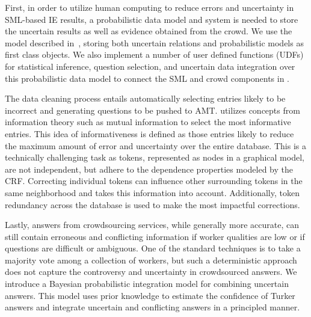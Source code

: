 First, in order to utilize human computing to reduce errors and uncertainty in SML-based IE results, a probabilistic data model and system is needed to store the uncertain results as well as evidence obtained from the crowd.  We use the model described in~\cite{DBLP:conf/icde/WangMFGH10}, storing both uncertain relations and probabilistic models as first class objects.  We also implement a number of user defined functions (UDFs) for statistical inference, question selection, and uncertain data integration over this probabilistic data model to connect the SML and crowd components in \sysName.


The data cleaning process entails automatically selecting entries likely to be incorrect and generating questions to be pushed to AMT.  \sysName utilizes concepts from information theory such as mutual information to select the most informative entries.  This idea of informativeness is defined as those entries likely to reduce the maximum amount of error and uncertainty over the entire database.  This is a technically challenging task as tokens, represented as nodes in a graphical model, are not independent, but adhere to the dependence properties modeled by the CRF.  Correcting individual tokens can influence other surrounding tokens in the same neighborhood and \sysName takes this information into account.  Additionally, token redundancy across the database is used to make the most impactful corrections.

Lastly, answers from crowdsourcing services, while generally more accurate, can still contain erroneous and conflicting information if worker qualities are low or if questions are difficult or ambiguous. One of the standard techniques is to take a majority vote among a collection of workers, but such a deterministic approach does not capture the controversy and uncertainty in crowdsourced answers. We introduce a Bayesian probabilistic integration model for combining uncertain answers. This model uses prior knowledge to estimate the confidence of Turker answers and integrate uncertain and conflicting answers in a principled manner.  

